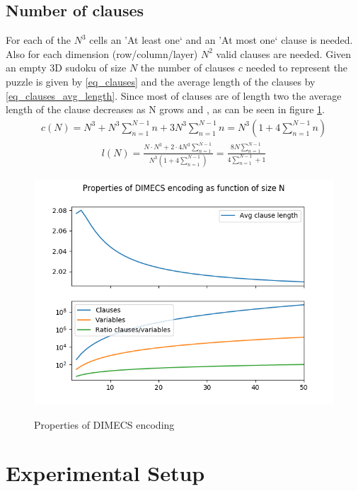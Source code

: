 \documentclass{article}
\begin{document}
\subsection{Number of clauses}
For each of the $N^3$ cells an 'At least one` and an 'At most one` clause is needed. Also for each dimension (row/column/layer) $N^2$ valid clauses are needed. Given an empty 3D sudoku of size $N$ the number of clauses $c$ needed to represent the puzzle is given by \ref{eq_clauses} and the average length of the clauses by \ref{eq_clauses_avg_length}. Since most of clauses are of length two the average length of the clause decreases as N grows and , as can be seen in figure \ref{fig_dimecs_props}.
\begin{align}
  \label{eq_clauses}
  c(N) = N^3 + N^3 \sum_{n=1}^{N-1}n + 3N^3\sum_{n=1}^{N-1}n = N^3(1 + 4\sum_{n=1}^{N-1}n)
\end{align}
\begin{align}
  \label{eq_clauses_avg_length}
  l(N) = \frac{N\cdot N^3 + 2\cdot4 N^3 \sum_{n=1}^{N-1}}{N^3(1 + 4\sum_{n=1}^{N-1})} = \frac{8N\sum_{n=1}^{N-1}}{4\sum_{n=1}^{N-1}+1}
\end{align}

\begin{figure}
  \centering
  \includegraphics[width=.9\textwidth]{dimecs_props}
  \label{fig_dimecs_props}
  \caption{Properties of DIMECS encoding}
\end{figure}

\section{Experimental Setup}
\end{document}
